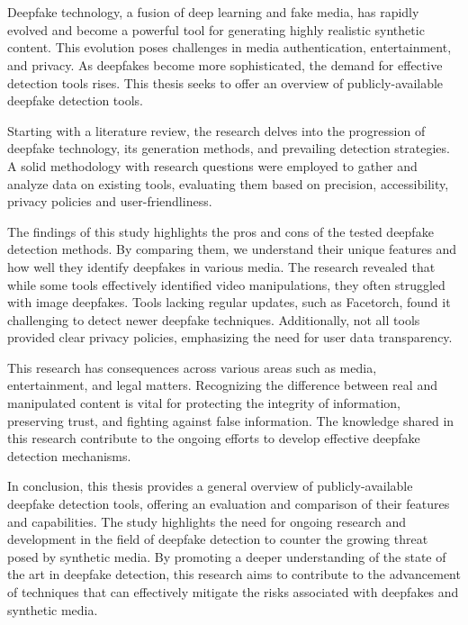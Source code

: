 \chapter{\abstractname}

Deepfake technology, a fusion of deep learning and fake media, has rapidly
evolved and become a powerful tool for generating highly realistic synthetic
content. This evolution poses challenges in media authentication, entertainment,
and privacy. As deepfakes become more sophisticated, the demand for effective
detection tools rises. This thesis seeks to offer an overview of publicly-available
deepfake detection tools.

Starting with a literature review, the research delves into the progression of
deepfake technology, its generation methods, and prevailing detection strategies.
A solid methodology with research questions were employed to gather and analyze
data on existing tools, evaluating them based on precision, accessibility, privacy
policies and user-friendliness.

The findings of this study highlights the pros and cons of the tested
deepfake detection methods. By comparing them, we understand their unique features
and how well they identify deepfakes in various media. The research revealed that
while some tools effectively identified video manipulations, they often struggled
with image deepfakes. Tools lacking regular updates, such as Facetorch, found it
challenging to detect newer deepfake techniques. Additionally, not all tools
provided clear privacy policies, emphasizing the need for user data transparency.

This research has consequences across various areas such as media, entertainment,
and legal matters. Recognizing the difference between real and manipulated content
is vital for protecting the integrity of information, preserving trust, and
fighting against false information. The knowledge shared in this research contribute
to the ongoing efforts to develop effective deepfake detection mechanisms.

In conclusion, this thesis provides a general overview of publicly-available
deepfake detection tools, offering an evaluation and comparison of their
features and capabilities. The study highlights the need for ongoing research and
development in the field of deepfake detection to counter the growing threat
posed by synthetic media. By promoting a deeper understanding of the state of
the art in deepfake detection, this research aims to contribute to the
advancement of techniques that can effectively mitigate the risks associated
with deepfakes and synthetic media.
